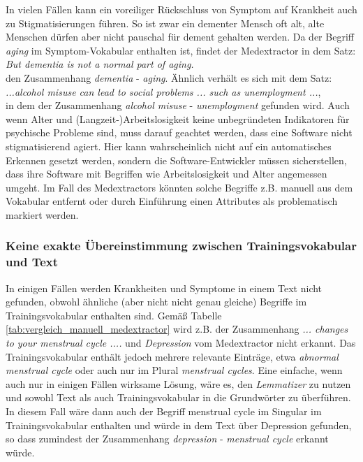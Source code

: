 In vielen Fällen kann ein voreiliger Rückschluss von Symptom auf Krankheit auch zu Stigmatisierungen führen. So ist zwar ein dementer Mensch oft alt, alte Menschen dürfen aber nicht pauschal für dement gehalten werden. Da der Begriff \emph{aging} im Symptom-Vokabular enthalten ist, findet der Medextractor in dem Satz:\\

\emph{\glqq But dementia is not a normal part of aging.}\grqq\\

den Zusammenhang \emph{dementia} - \emph{aging}. Ähnlich verhält es sich mit dem Satz:\\

\emph{\glqq ...alcohol misuse can lead to social problems ... such as unemployment ...\grqq},\\

in dem der Zusammenhang \emph{alcohol misuse} - \emph{unemployment} gefunden wird. Auch wenn Alter und (Langzeit-)Arbeitslosigkeit keine unbegründeten Indikatoren für psychische Probleme sind, muss darauf geachtet werden, dass eine Software nicht stigmatisierend agiert. Hier kann wahrscheinlich nicht auf ein automatisches Erkennen gesetzt werden, sondern die Software-Entwickler müssen sicherstellen, dass ihre Software mit Begriffen wie Arbeitslosigkeit und Alter angemessen umgeht. Im Fall des Medextractors könnten solche Begriffe z.B. manuell aus dem Vokabular entfernt oder durch Einführung einen Attributes als problematisch markiert werden.

\subsubsection{Keine exakte Übereinstimmung zwischen Trainingsvokabular und Text}
\label{subsec: nomatch} 

In einigen Fällen werden Krankheiten und Symptome in einem Text nicht gefunden, obwohl ähnliche (aber nicht nicht genau gleiche) Begriffe im Trainingsvokabular enthalten sind. Gemäß Tabelle \ref{tab:vergleich_manuell_medextractor} wird z.B. der Zusammenhang \emph{\glqq ... changes to your menstrual cycle ....\grqq} und \emph{Depression} vom Medextractor nicht erkannt. Das Trainingsvokabular enthält jedoch mehrere relevante Einträge, etwa \emph{abnormal menstrual cycle} oder auch nur im Plural \emph{menstrual cycles}. Eine einfache, wenn auch nur in einigen Fällen wirksame Lösung, wäre es, den \emph{Lemmatizer} zu nutzen und sowohl Text als auch Trainingsvokabular in die Grundwörter zu überführen. In diesem Fall wäre dann auch der Begriff {menstrual cycle} im Singular im Trainingsvokabular enthalten und würde in dem Text über Depression gefunden, so dass zumindest der Zusammenhang \emph{depression} - \emph{menstrual cycle} erkannt würde.

